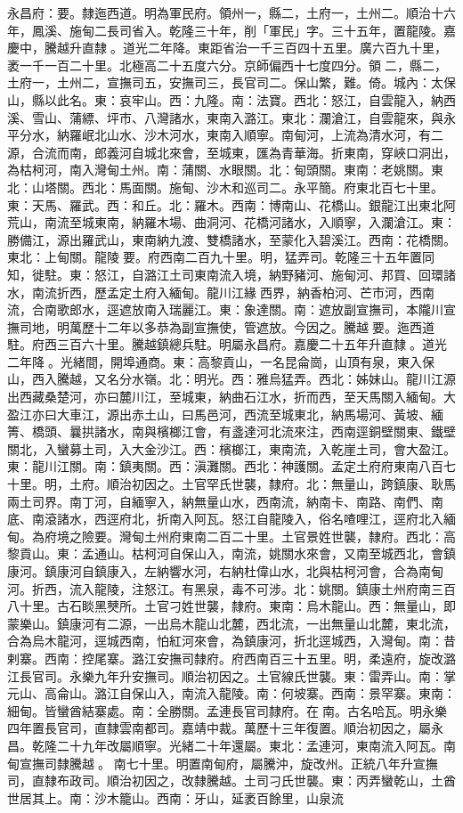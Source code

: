 \begin{pinyinscope}
永昌府：要。隸迤西道。明為軍民府。領州一，縣二，土府一，土州二。順治十六年，鳳溪、施甸二長司省入。乾隆三十年，削「軍民」字。三十五年，置龍陵。嘉慶中，騰越升直隸。道光二年降。東距省治一千三百四十五里。廣六百九十里，袤一千一百二十里。北極高二十五度六分。京師偏西十七度四分。領二，縣二，土府一，土州二，宣撫司五，安撫司三，長官司二。保山繁，難。倚。城內：太保山，縣以此名。東：哀牢山。西：九隆。南：法寶。西北：怒江，自雲龍入，納西溪、雪山、蒲縹、坪市、八灣諸水，東南入潞江。東北：瀾滄江，自雲龍來，與永平分水，納羅岷北山水、沙木河水，東南入順寧。南甸河，上流為清水河，有二源，合流而南，郎義河自城北來會，至城東，匯為青華海。折東南，穿峽口洞出，為枯柯河，南入灣甸土州。南：蒲關、水眼關。北：甸頭關。東南：老姚關。東北：山塔關。西北：馬面關。施甸、沙木和巡司二。永平簡。府東北百七十里。東：天馬、羅武。西：和丘。北：羅木。西南：博南山、花橋山。銀龍江出東北阿荒山，南流至城東南，納羅木場、曲洞河、花橋河諸水，入順寧，入瀾滄江。東：勝備江，源出羅武山，東南納九渡、雙橋諸水，至蒙化入碧溪江。西南：花橋關。東北：上甸關。龍陵要。府西南二百九十里。明，猛弄司。乾隆三十五年置同知，徙駐。東：怒江，自潞江土司東南流入境，納野豬河、施甸河、邦買、回環諸水，南流折西，歷孟定土府入緬甸。龍川江緣西界，納香柏河、芒市河，西南流，合南歌郎水，逕遮放南入瑞麗江。東：象達關。南：遮放副宣撫司，本隴川宣撫司地，明萬歷十二年以多恭為副宣撫使，管遮放。今因之。騰越要。迤西道駐。府西三百六十里。騰越鎮總兵駐。明屬永昌府。嘉慶二十五年升直隸。道光二年降。光緒間，開埠通商。東：高黎貢山，一名昆侖崗，山頂有泉，東入保山，西入騰越，又名分水嶺。北：明光。西：雅烏猛弄。西北：姊妹山。龍川江源出西藏桑楚河，亦曰麓川江，至城東，納曲石江水，折而西，至天馬關入緬甸。大盈江亦曰大車江，源出赤土山，曰馬邑河，西流至城東北，納馬場河、黃坡、緬箐、橋頭、曩拱諸水，南與檳榔江會，有盞達河北流來注，西南逕銅壁關東、鐵壁關北，入蠻募土司，入大金沙江。西：檳榔江，東南流，入乾崖土司，會大盈江。東：龍川江關。南：鎮夷關。西：滇灘關。西北：神護關。孟定土府府東南八百七十里。明，土府。順治初因之。土官罕氏世襲，隸府。北：無量山，跨鎮康、耿馬兩土司界。南丁河，自緬寧入，納無量山水，西南流，納南卡、南路、南們、南底、南滾諸水，西逕府北，折南入阿瓦。怒江自龍陵入，俗名喳哩江，逕府北入緬甸。為府境之險要。灣甸土州府東南二百二十里。土官景姓世襲，隸府。西北：高黎貢山。東：孟通山。枯柯河自保山入，南流，姚關水來會，又南至城西北，會鎮康河。鎮康河自鎮康入，左納響水河，右納杜偉山水，北與枯柯河會，合為南甸河。折西，流入龍陵，注怒江。有黑泉，毒不可涉。北：姚關。鎮康土州府南三百八十里。古石睒黑僰所。土官刁姓世襲，隸府。東南：烏木龍山。西：無量山，即蒙樂山。鎮康河有二源，一出烏木龍山北麓，西北流，一出無量山北麓，東北流，合為烏木龍河，逕城西南，怕紅河來會，為鎮康河，折北逕城西，入灣甸。南：昔剌寨。西南：控尾寨。潞江安撫司隸府。府西南百三十五里。明，柔遠府，旋改潞江長官司。永樂九年升安撫司。順治初因之。土官線氏世襲。東：雷弄山。南：掌元山、高侖山。潞江自保山入，南流入龍陵。南：何坡寨。西南：景罕寨。東南：細甸。皆蠻酋結寨處。南：全勝關。孟連長官司隸府。在南。古名哈瓦。明永樂四年置長官司，直隸雲南都司。嘉靖中裁。萬歷十三年復置。順治初因之，屬永昌。乾隆二十九年改屬順寧。光緒二十年還屬。東北：孟連河，東南流入阿瓦。南甸宣撫司隸騰越。南七十里。明置南甸府，屬騰沖，旋改州。正統八年升宣撫司，直隸布政司。順治初因之，改隸騰越。土司刁氏世襲。東：丙弄蠻乾山，土酋世居其上。南：沙木籠山。西南：牙山，延袤百餘里，山泉流
\end{pinyinscope}

